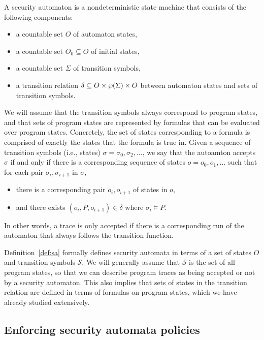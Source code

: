 \documentclass[11pt,twoside]{scrartcl}
\begin{document}
\begin{definition}
\label{def:sa}
A security automaton is a nondeterministic state machine that consists of the following components:
\begin{itemize}
\item a countable set $O$ of automaton states,
\item a countable set $O_0 \subseteq O$ of initial states,
\item a countable set $\Sigma$ of transition symbols,
\item a transition relation $\delta \subseteq O \times \wp(\Sigma) \times O$ between automaton states and sets of transition symbols.
\end{itemize}
We will assume that the transition symbols always correspond to program states, and that sets of program states are represented by formulas that can be evaluated over program states.
Concretely, the set of states corresponding to a formula is comprised of exactly the states that the formula is true in.
Given a sequence of transition symbols (i.e., states) $\sigma = \sigma_0,\sigma_2,\ldots$, we say that the autoamton accepts $\sigma$ if and only if there is a corresponding sequence of states $o = o_0,o_1,\ldots$ such that for each pair $\sigma_{i},\sigma_{i+1}$ in $\sigma$,
\begin{itemize}
\item there is a corresponding pair $o_{i},o_{i+1}$ of states in $o$,
\item and there exists $(o_{i}, P, o_{i+1}) \in \delta$ where $\sigma_i \vDash P$.
\end{itemize}
In other words, a trace is only accepted if there is a corresponding run of the automaton that always follows the transition function.
\end{definition}

Definition~\ref{def:sa} formally defines security automata in terms of a set of states $O$ and transition symbols $\mathcal{S}$. We will generally assume that $\mathcal{S}$ is the set of all program states, so that we can describe program traces as being accepted or not by a security automaton. This also implies that sets of states in the transition relation are defined in terms of formulas on program states, which we have already studied extensively.

\subsection{Enforcing security automata policies}
\end{document}
